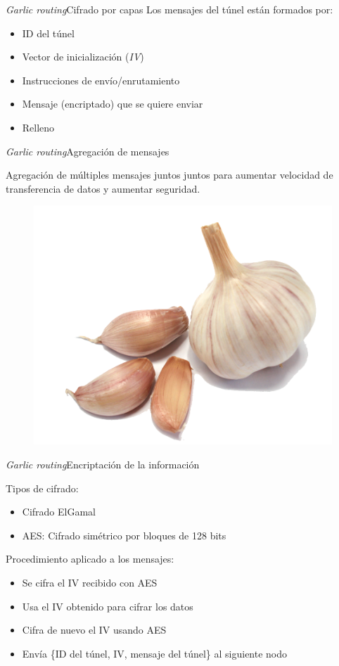 \documentclass[spanish]{beamer}
\begin{document}
 \begin{frame}{\textit{Garlic routing}}{Cifrado por capas}
	Los mensajes del túnel están formados por:
	
	\vspace{1.5em}
	\begin{itemize}
	\item ID del túnel
	\item Vector de inicialización (\textit{IV})
	\item Instrucciones de envío/enrutamiento
	\item Mensaje (encriptado) que se quiere enviar
	\item Relleno
\end{itemize}
\end{frame}
 
 
 \begin{frame}{\textit{Garlic routing}}{Agregación de mensajes}
 
 
 Agregación de múltiples mensajes juntos juntos para aumentar velocidad de transferencia de datos y aumentar seguridad.
 
 \begin{figure}
\centering
\includegraphics[width=.35\textwidth]{img/garlic}
\end{figure}

 	
 \end{frame}
 
 \begin{frame}{\textit{Garlic routing}}{Encriptación de la información}
 
 Tipos de cifrado:
 \begin{itemize}
 	\item Cifrado ElGamal
 	\item AES: Cifrado simétrico por bloques de 128 bits
 \end{itemize}
 \vspace{1em}
 
 Procedimiento aplicado a los mensajes:
 	\begin{itemize}
 		\item Se cifra el IV recibido con AES
 		\item Usa el IV obtenido para cifrar los datos
 		\item Cifra de nuevo el IV usando AES
 		\item Envía \{ID del túnel, IV, mensaje del túnel\} al siguiente nodo
 	\end{itemize}

 
 \end{frame}
 
\end{document}
